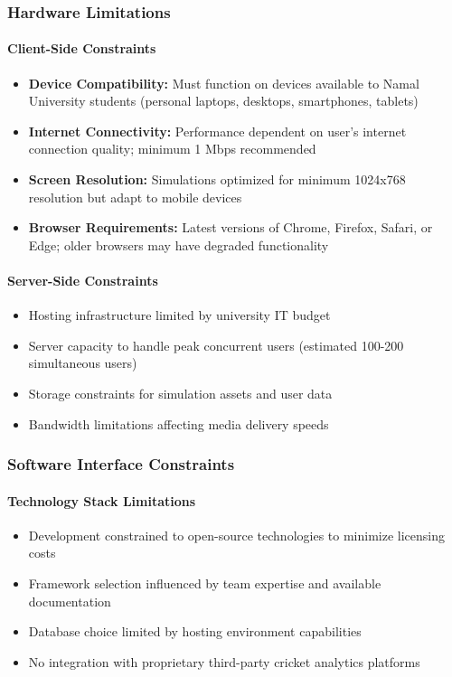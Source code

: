 \documentclass[12pt,a4paper]{article}
\begin{document}
\begin{enumerate}
\subsubsection{Hardware Limitations}
\paragraph{Client-Side Constraints}
\begin{itemize}
    \item \textbf{Device Compatibility:} Must function on devices available to Namal University students (personal laptops, desktops, smartphones, tablets)
    \item \textbf{Internet Connectivity:} Performance dependent on user's internet connection quality; minimum 1 Mbps recommended
    \item \textbf{Screen Resolution:} Simulations optimized for minimum 1024x768 resolution but adapt to mobile devices
    \item \textbf{Browser Requirements:} Latest versions of Chrome, Firefox, Safari, or Edge; older browsers may have degraded functionality
\end{itemize}

\paragraph{Server-Side Constraints}
\begin{itemize}
    \item Hosting infrastructure limited by university IT budget
    \item Server capacity to handle peak concurrent users (estimated 100-200 simultaneous users)
    \item Storage constraints for simulation assets and user data
    \item Bandwidth limitations affecting media delivery speeds
\end{itemize}

\subsubsection{Software Interface Constraints}
\paragraph{Technology Stack Limitations}
\begin{itemize}
    \item Development constrained to open-source technologies to minimize licensing costs
    \item Framework selection influenced by team expertise and available documentation
    \item Database choice limited by hosting environment capabilities
    \item No integration with proprietary third-party cricket analytics platforms
\end{itemize}


\end{enumerate}
\end{document}
